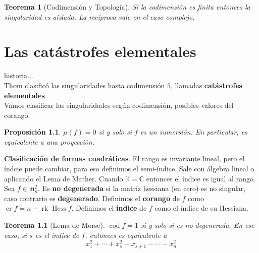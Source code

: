 \documentclass[12pt]{book}
\newtheorem{teo}{Teorema}
\newtheorem{pro}{Proposición}
\newcommand{\mm}{\mathfrak{m}_n}
\newcommand{\cod}{\operatorname{cod}}
\begin{document}
\begin{teo}[Codimensión y Topología]
Si la codimensión es finita entonces la singularidad es aislada. La recíproca vale en el caso complejo.
\end{teo}














\chapter{Las catástrofes elementales}

historia...\\
Thom clasificó las singularidades hasta codimensión $5$, llamadas \textbf{catástrofes elementales}.\\
Vamos clasificar las singularidades según codimensión, posibles valores del corango.\\



\begin{pro}
$\mu(f)= 0$ si y solo si $f$ es un sumersión. En particular, es equivalente a una proyección.
\end{pro}



\textbf{Clasificación de formas cuadráticas}. El rango es invariante lineal, pero el índcie puede cambiar, para eso definimos el semi-índice. Sale con álgebra lineal o aplicando el Lema de Mather. Cuando $\mathbb{K}= \mathbb{C}$ entonces el índice es igual al rango. \\ %



Sea $f \in \mm ^2$. Es \textbf{no degenerada} si la matriz hessiana (en cero) es no singular, caso contrario es \textbf{degenerado}. Definimos el \textbf{corango} de $f$ como $\operatorname{cr} f = n- \operatorname{rk} \operatorname{Hess} f $. Definimos el \textbf{índice} de $f$ como el índice de su Hessiana.



\begin{teo}[Lema de Morse]
$\cod f =1$ si y solo si es no degenerada. En ese caso, si $s$ es el índice de $f$, entonces es equivalente a $$ x_1 ^2  + \cdots + x_s ^2 -x _{s+1} - \cdots - x_{n}^2 $$
\end{teo}
\end{document}

